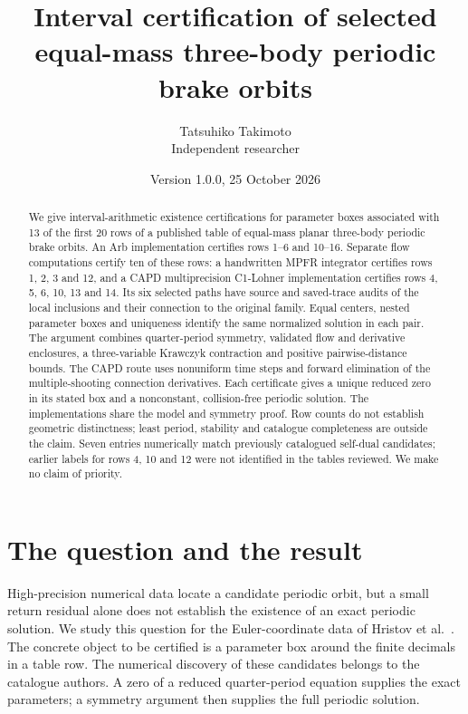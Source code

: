 \documentclass[10pt,a4paper]{article}
\title{Interval certification of selected equal-mass\newline
three-body periodic brake orbits}
\author{Tatsuhiko Takimoto\\\small Independent researcher}
\date{Version 1.0.0, 25 October 2026}
\theoremstyle{remark}
\begin{document}
\maketitle
\begin{abstract}
We give interval-arithmetic existence certifications for parameter boxes
associated with 13 of the first 20 rows of a published table of equal-mass
planar three-body periodic brake orbits. An Arb implementation certifies
rows 1--6 and 10--16. Separate flow computations certify ten of these
rows: a handwritten MPFR integrator certifies rows 1, 2, 3 and 12, and a
CAPD multiprecision C1-Lohner implementation certifies rows 4, 5, 6, 10,
13 and 14. Its six selected paths have source and saved-trace audits
of the local inclusions and their connection to the original family.
Equal centers, nested parameter boxes and uniqueness identify the same
normalized solution in each pair. The argument combines quarter-period
symmetry, validated flow and derivative enclosures, a three-variable
Krawczyk contraction and positive pairwise-distance bounds. The CAPD
route uses nonuniform time steps and forward elimination of the
multiple-shooting connection derivatives. Each certificate gives a
unique reduced zero in its stated box and a nonconstant, collision-free
periodic solution. The implementations share the model and symmetry
proof. Row counts do not establish geometric distinctness; least period,
stability and catalogue completeness are outside the claim. Seven entries
numerically match previously catalogued self-dual candidates; earlier
labels for rows 4, 10 and 12 were not identified in the tables reviewed.
We make no claim of priority.
\end{abstract}

\section{The question and the result}
High-precision numerical data locate a candidate periodic orbit, but a
small return residual alone does not establish the existence of an exact
periodic solution. We study this question for the Euler-coordinate data
of Hristov et al.\ \cite{Hristov,Data}. The concrete object to be certified
is a parameter box around the finite decimals in a table row. The
numerical discovery of these candidates belongs to the catalogue authors.
A zero of
a reduced quarter-period equation supplies the exact parameters; a
symmetry argument then supplies the full periodic solution.
\end{document}
